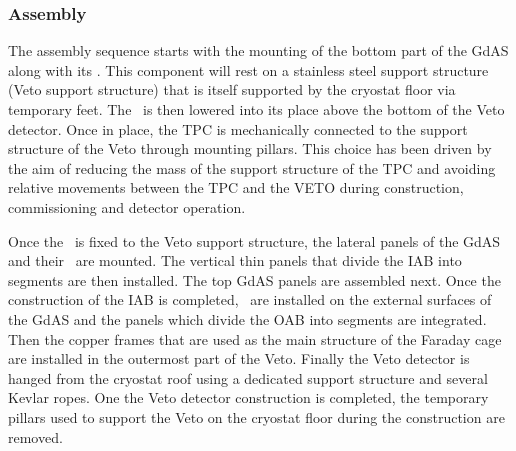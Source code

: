 \subsubsection{Assembly}

The assembly sequence starts with the mounting of the bottom part of the GdAS along with its \DSkPdms. This component will rest on a stainless steel support structure (Veto support structure) that is itself supported by the cryostat floor via temporary feet. The \TPC\ is then lowered into its place above the bottom of the Veto detector. Once in place, the TPC is mechanically connected to the support structure of the Veto through mounting pillars. This choice has been driven by the aim of reducing the mass of the support structure of the TPC and avoiding relative movements between the TPC and the VETO during construction, commissioning and detector operation. 

Once the \TPC\ is fixed to the Veto support structure, the lateral panels of the GdAS and their \DSkPdms\ are mounted.  The vertical thin panels that divide the IAB into segments are then installed. The top GdAS panels are assembled next. Once the construction of the IAB is completed, \DSkPdms\ are installed on the external surfaces of the GdAS and the panels which divide the OAB into segments are integrated. Then the copper frames that are used as the main structure of the Faraday cage are installed in the outermost part of the Veto. Finally the Veto detector is hanged from the cryostat roof using a dedicated support structure and several Kevlar ropes. One the Veto detector construction is completed, the temporary pillars used to support the Veto on the cryostat floor during the construction are removed. 

